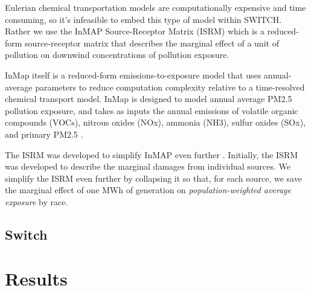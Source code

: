 \documentclass[a4paper]{article}
\theoremstyle{definition}
\theoremstyle{plain}
\begin{document}
Eulerian chemical transportation models are computationally expensive and time consuming, so it's infeasible to embed this type of model within SWITCH.  Rather we use the InMAP Source-Receptor Matrix (ISRM) which is a reduced-form source-receptor matrix that describes the marginal effect of a unit of pollution on downwind concentrations of pollution exposure.

InMap itself is a reduced-form emissions-to-exposure model that uses annual-average parameters to reduce computation complexity relative to a time-resolved chemical transport model. InMap is designed to model annual average PM2.5 pollution exposure, and takes as inputs the annual emissions of volatile organic compounds (VOCs), nitrous oxides (NOx), ammonia (NH3), sulfur oxides (SOx), and primary PM2.5 \citep{Tessum2017InMAP:Interventions}.

The ISRM was developed to simplify InMAP even further \citep{Goodkind2019Fine-scaleEmissions}.  Initially, the ISRM was developed to describe the marginal damages from individual sources.  We simplify the ISRM even further by collapsing it so that, for each source, we save the marginal effect of one MWh of generation on \textit{population-weighted average exposure} by race.

\subsection{Switch}

\section{Results}
\end{document}
